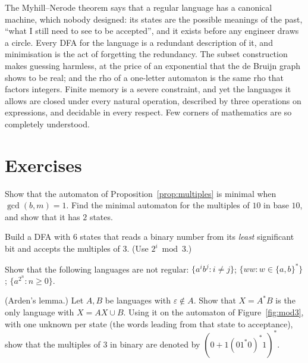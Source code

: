 \begin{beauty}
The Myhill--Nerode theorem says that a regular language has a canonical machine, which nobody designed: its states are the possible meanings of the past, ``what I still need to see to be accepted'', and it exists before any engineer draws a circle. Every DFA for the language is a redundant description of it, and minimisation is the act of forgetting the redundancy. The subset construction makes guessing harmless, at the price of an exponential that the de Bruijn graph shows to be real; and the rho of a one-letter automaton is the same rho that factors integers. Finite memory is a severe constraint, and yet the languages it allows are closed under every natural operation, described by three operations on expressions, and decidable in every respect. Few corners of mathematics are so completely understood.
\end{beauty}

\section{Exercises}

\begin{exercise}[$\star\star$]\label{ex:basebminimal}
Show that the automaton of Proposition~\ref{prop:multiples} is minimal when $\gcd(b,m)=1$. Find the minimal automaton for the multiples of $10$ in base $10$, and show that it has $2$ states.
\end{exercise}

\begin{exercise}[$\star$]\label{ex:lsbfirst}
Build a DFA with $6$ states that reads a binary number from its \emph{least} significant bit and accepts the multiples of $3$. (Use $2^i\bmod3$.)
\end{exercise}

\begin{exercise}[$\star$]\label{ex:nonregular}
Show that the following languages are not regular: $\{a^ib^j:i\ne j\}$; $\{ww:w\in\{a,b\}^*\}$; $\{a^{2^n}:n\ge0\}$.
\end{exercise}

\begin{exercise}[$\star\star$]\label{ex:arden}
(Arden's lemma.) Let $A,B$ be languages with $\varepsilon\notin A$. Show that $X=A^*B$ is the only language with $X=AX\cup B$. Using it on the automaton of Figure~\ref{fig:mod3}, with one unknown per state (the words leading from that state to acceptance), show that the multiples of $3$ in binary are denoted by $(0+1(01^*0)^*1)^*$.
\end{exercise}

